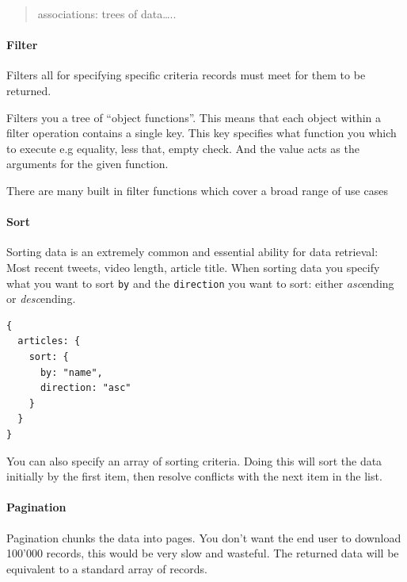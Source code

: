\documentclass[
  12pt,
]{article}
\newcommand{\passthrough}[1]{#1}
\let\oldparagraph\paragraph
\renewcommand{\paragraph}[1]{\oldparagraph{#1}\mbox{}}
\begin{document}
\begin{quote}
associations: trees of data\ldots..
\end{quote}

\hypertarget{filter}{%
\paragraph{Filter}\label{filter}}

Filters all for specifying specific criteria records must meet for them
to be returned.

Filters you a tree of ``object functions''. This means that each object
within a filter operation contains a single key. This key specifies what
function you which to execute e.g equality, less that, empty check. And
the value acts as the arguments for the given function.

There are many built in filter functions which cover a broad range of
use cases

\hypertarget{sort}{%
\paragraph{Sort}\label{sort}}

Sorting data is an extremely common and essential ability for data
retrieval: Most recent tweets, video length, article title. When sorting
data you specify what you want to sort \passthrough{\lstinline!by!} and
the \passthrough{\lstinline!direction!} you want to sort: either
\emph{asc}ending or \emph{desc}ending.

\begin{lstlisting}[caption={This query will return all articles ordered by the articles "name" attribute.}]
{
  articles: {
    sort: {
      by: "name",
      direction: "asc"
    }
  }
}
\end{lstlisting}

You can also specify an array of sorting criteria. Doing this will sort
the data initially by the first item, then resolve conflicts with the
next item in the list.

\label{pagination}

\hypertarget{pagination}{%
\paragraph{Pagination}\label{pagination}}

Pagination chunks the data into pages. You don't want the end user to
download 100'000 records, this would be very slow and wasteful. The
returned data will be equivalent to a standard array of records.
\end{document}
